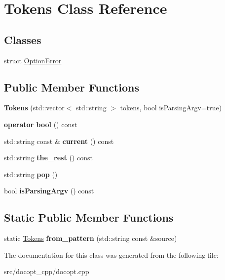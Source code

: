 \hypertarget{classTokens}{}\section{Tokens Class Reference}
\label{classTokens}
\subsection*{Classes}
\begin{DoxyCompactItemize}
\item 
struct \hyperlink{structTokens_1_1OptionError}{Option\+Error}
\end{DoxyCompactItemize}
\subsection*{Public Member Functions}
\begin{DoxyCompactItemize}
\item 
\mbox{\label{classTokens_a6f319545790af24e81a9e811cbd01edb}} 
{\bfseries Tokens} (std\+::vector$<$ std\+::string $>$ tokens, bool is\+Parsing\+Argv=true)
\item 
\mbox{\label{classTokens_aedd895b4073f541ef319564c76b91c19}} 
{\bfseries operator bool} () const
\item 
\mbox{\label{classTokens_acb0fda75975c72f45ca93b0236c3e65b}} 
std\+::string const  \& {\bfseries current} () const
\item 
\mbox{\label{classTokens_a642f50345bdc0cca8add2305dc44d0d7}} 
std\+::string {\bfseries the\+\_\+rest} () const
\item 
\mbox{\label{classTokens_ae07c89765c0406cdf25c638f5b98a070}} 
std\+::string {\bfseries pop} ()
\item 
\mbox{\label{classTokens_a1efe979cd80d3af5559c9d7bf428e6e7}} 
bool {\bfseries is\+Parsing\+Argv} () const
\end{DoxyCompactItemize}
\subsection*{Static Public Member Functions}
\begin{DoxyCompactItemize}
\item 
\mbox{\label{classTokens_a16874c82bd94f507cd69bbf8ab342768}} 
static \hyperlink{classTokens}{Tokens} {\bfseries from\+\_\+pattern} (std\+::string const \&source)
\end{DoxyCompactItemize}


The documentation for this class was generated from the following file\+:\begin{DoxyCompactItemize}
\item 
src/docopt\+\_\+cpp/docopt.\+cpp\end{DoxyCompactItemize}
